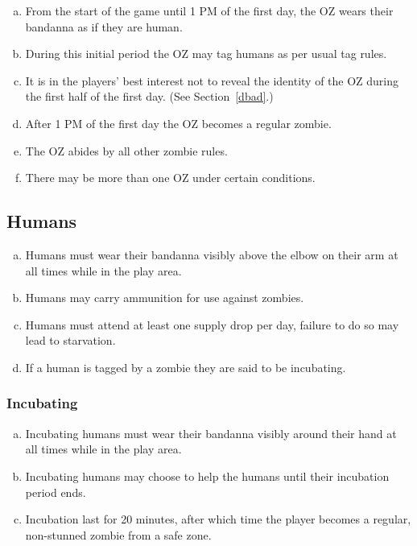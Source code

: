\documentclass[a4paper,12pt]{article}
\begin{document}
\begin{enumerate}[(a)]
    \item From the start of the game until 1 PM of the first day, the OZ wears their bandanna as if they are human. 
    \item During this initial period the OZ may tag humans as per usual tag rules.
    \item It is in the players' best interest not to reveal the identity of the OZ during the first half of the first day. (See Section~\ref{dbad}.)
    \item After 1 PM of the first day the OZ becomes a regular zombie.
    \item The OZ abides by all other zombie rules.
    \item There may be more than one OZ under certain conditions.
\end{enumerate}

\subsection{Humans}

\begin{enumerate}[(a)]
    \item Humans must wear their bandanna visibly above the elbow on their arm at all times while in the play area.
    \item Humans may carry ammunition for use against zombies.
    \item Humans must attend at least one supply drop per day, failure to do so may lead to starvation.
    \item If a human is tagged by a zombie they are said to be incubating.
\end{enumerate}

\subsubsection{Incubating}
\label{Incubating}
\begin{enumerate}[(a)]
    \item Incubating humans must wear their bandanna visibly around their hand at all times while in the play area.
    \item Incubating humans may choose to help the humans until their incubation period ends.
    \item Incubation last for 20 minutes, after which time the player becomes a regular, non-stunned zombie from a safe zone.
\end{enumerate}
\end{document}
